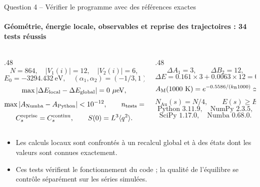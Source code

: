 \documentclass[aspectratio=169,10pt]{beamer}
\newcommand{\kb}{k_{\mathrm B}}
\newcommand{\Au}{\mathrm{Au}}
\newcommand{\deuxpoints}[2]{\par\smallskip\begin{itemize}\setlength{\itemsep}{2pt}\setlength{\parskip}{0pt}\item #1\item #2\end{itemize}}
\begin{document}
\begin{frame}{Question 4 -- Vérifier le programme avec des références exactes}
\framesubtitle{Géométrie, énergie locale, observables et reprise des trajectoires : 34 tests réussis}
\begin{columns}[T,onlytextwidth]
\begin{column}{.48\textwidth}
\[
N=864,\quad |V_1(i)|=12,\quad |V_2(i)|=6,
\]
\[
E_0=-3294.432\ \mathrm{eV},\quad
(\alpha_1,\alpha_2)=(-1/3,1),\quad\eta=q=1.
\]
\[
\max\left|\Delta E_{\rm local}-\Delta E_{\rm global}\right|=0\ \mathrm{\mu eV},
\]
\[
\max|A_{\rm Numba}-A_{\rm Python}|<10^{-12},
\qquad n_{\rm tests}=34.
\]
\[
C_s^{\rm reprise}=C_s^{\rm continu},\qquad
S(0)=L^3\langle q^2\rangle.
\]
\end{column}
\begin{column}{.48\textwidth}
\[
\Delta A_1=3,\qquad\Delta B_2=12,
\]
\[
\Delta E=0.161\times3+0.0063\times12=0.5586\ \mathrm{eV},
\]
\[
A_{\rm M}(1000\ \mathrm K)=e^{-0.5586/(\kb1000)}\simeq0.00153.
\]
\[
N_{\Au}(s)=N/4,\qquad E(s)\ge E_0.
\]
\[
\text{Python }3.11.9,\quad\text{NumPy }2.3.5,
\]
\[
\text{SciPy }1.17.0,\quad\text{Numba }0.68.0.
\]
\end{column}
\end{columns}
\deuxpoints{Les calculs locaux sont confrontés à un recalcul global et à des états dont les valeurs sont connues exactement.}{Ces tests vérifient le fonctionnement du code ; la qualité de l'équilibre se contrôle séparément sur les séries simulées.}
\end{frame}
\end{document}
